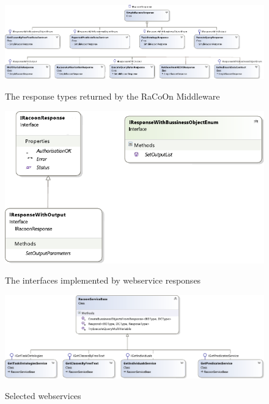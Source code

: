  \begin{figure}
\myfloatalign
{\includegraphics[width=\linewidth]{gfx/MiddlewareServicesClassesResponseOnly}} 
\caption{The response types returned by the RaCoOn Middleware}
\label{fig:MiddlewareResponses}
\end{figure}

 \begin{figure}
\myfloatalign
{\includegraphics[width=\linewidth]{gfx/Res}} 
\caption{The interfaces implemented by webservice responses}
\label{fig:ResponseInterfaces}
\end{figure}

 \begin{figure}
\myfloatalign
{\includegraphics[width=\linewidth]{gfx/RacoonServices}} 
\caption{Selected webservices}
\label{fig:services}
\end{figure}

